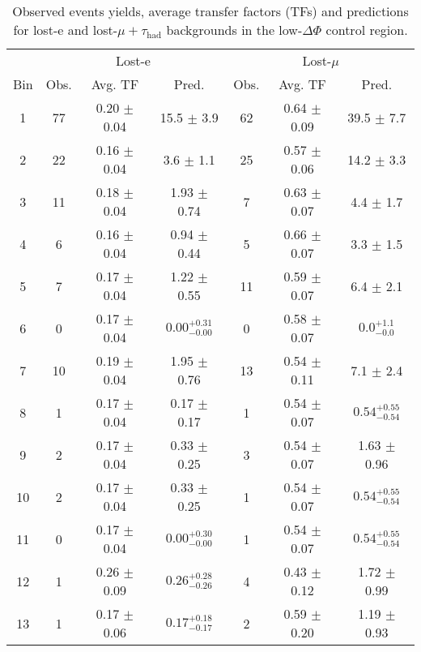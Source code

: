 \begin{table}[h!]
\centering
\caption[Lost lepton predictions in low \dphi]{Observed events yields, average transfer factors (TFs) and predictions for lost-e and 
lost-$\mu+\tau_{\text{had}}$ backgrounds in the low-$\Delta\Phi$ control region.}
\label{tab:lostLeptonPredictions_LDP}
\begin{tabular}{c|c|c|c|c|c|c}
\hline
     &  \multicolumn{3}{c}{Lost-e} & \multicolumn{3}{c}{Lost-$\mu$} \\\cline{2-7}
Bin & Obs. & Avg. TF & Pred. & Obs. & Avg. TF &  Pred. \\ 
\hline \hline
1 & 77  & 0.20  $\pm$  0.04  & 15.5 $\pm$ 3.9 & 62  & 0.64  $\pm$  0.09  & 39.5 $\pm$ 7.7    \\\hline
2 & 22  & 0.16  $\pm$  0.04  & 3.6 $\pm$ 1.1 & 25  & 0.57  $\pm$  0.06  & 14.2 $\pm$ 3.3    \\\hline
3 & 11  & 0.18  $\pm$  0.04  & 1.93 $\pm$ 0.74 & 7  & 0.63  $\pm$  0.07  & 4.4 $\pm$ 1.7    \\\hline
4 & 6  & 0.16  $\pm$  0.04  & 0.94 $\pm$ 0.44 & 5  & 0.66  $\pm$  0.07  & 3.3 $\pm$ 1.5    \\\hline
5 & 7  & 0.17  $\pm$  0.04  & 1.22 $\pm$ 0.55 & 11  & 0.59  $\pm$  0.07  & 6.4 $\pm$ 2.1    \\\hline
6 & 0  & 0.17  $\pm$  0.04  & $0.00_{-0.00}^{+0.31}$ & 0  & 0.58  $\pm$  0.07  & $0.0_{-0.0}^{+1.1}$    \\\hline
7 & 10  & 0.19  $\pm$  0.04  & 1.95 $\pm$ 0.76 & 13  & 0.54  $\pm$  0.11  & 7.1 $\pm$ 2.4    \\\hline
8 & 1  & 0.17  $\pm$  0.04  & 0.17 $\pm$ 0.17 & 1  & 0.54  $\pm$  0.07  & $0.54^{+0.55}_{-0.54}$    \\\hline
9 & 2  & 0.17  $\pm$  0.04  & 0.33 $\pm$ 0.25 & 3  & 0.54  $\pm$  0.07  & 1.63 $\pm$ 0.96    \\\hline
10 & 2  & 0.17  $\pm$  0.04  & 0.33 $\pm$ 0.25 & 1  & 0.54  $\pm$  0.07  & $0.54^{+0.55}_{-0.54}$    \\\hline
11 & 0  & 0.17  $\pm$  0.04  & $0.00_{-0.00}^{+0.30}$ & 1  & 0.54  $\pm$  0.07  & $0.54^{+0.55}_{-0.54}$    \\\hline
12 & 1  & 0.26  $\pm$  0.09  & $0.26_{-0.26}^{+0.28}$ & 4  & 0.43  $\pm$  0.12  & 1.72 $\pm$ 0.99    \\\hline
13 & 1  & 0.17  $\pm$  0.06  & $0.17_{-0.17}^{+0.18}$ & 2  & 0.59  $\pm$  0.20  & 1.19 $\pm$ 0.93    \\\hline

\end{tabular}
\end{table}
